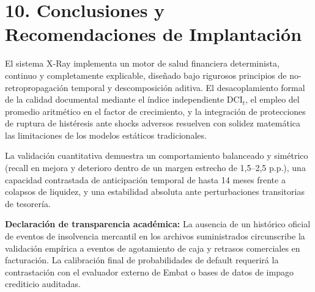 \documentclass[10pt,a4paper]{article}
\begin{document}
\clearpage



\clearpage



\section*{10. Conclusiones y Recomendaciones de Implantación}

El sistema X-Ray implementa un motor de salud financiera determinista, continuo y completamente explicable, diseñado bajo rigurosos principios de no-retropropagación temporal y descomposición aditiva. El desacoplamiento formal de la calidad documental mediante el índice independiente $\text{DCI}_t$, el empleo del promedio aritmético en el factor de crecimiento, y la integración de protecciones de ruptura de histéresis ante shocks adversos resuelven con solidez matemática las limitaciones de los modelos estáticos tradicionales.

La validación cuantitativa demuestra un comportamiento balanceado y simétrico (recall en mejora y deterioro dentro de un margen estrecho de 1,5--2,5 p.p.), una capacidad contrastada de anticipación temporal de hasta 14 meses frente a colapsos de liquidez, y una estabilidad absoluta ante perturbaciones transitorias de tesorería.

\textbf{Declaración de transparencia académica:} La ausencia de un histórico oficial de eventos de insolvencia mercantil en los archivos suministrados circunscribe la validación empírica a eventos de agotamiento de caja y retrasos comerciales en facturación. La calibración final de probabilidades de default requerirá la contrastación con el evaluador externo de Embat o bases de datos de impago crediticio auditadas.
\end{document}
